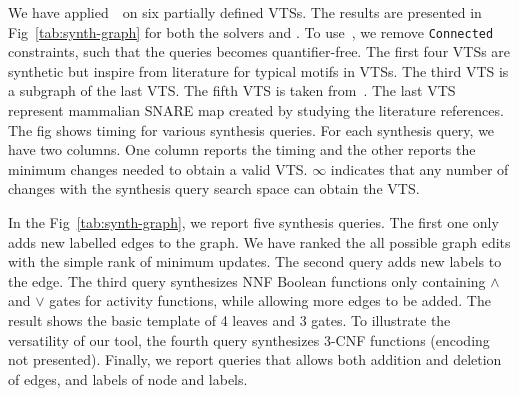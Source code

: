 
We have applied~\ourtool~on six partially defined VTSs.
%
The results are presented in Fig~\ref{tab:synth-graph} for both the solvers
\depqbf and \zthree.
%
To use~\zthree, we remove \texttt{Connected} constraints, such that the queries becomes
quantifier-free.
%
%
%
The first four VTSs are synthetic but inspire from literature for
typical motifs in VTSs. 
The third VTS is a subgraph of the last VTS.
%
%
The fifth VTS is taken from~\cite{burri2004complete}.
%
The last VTS represent mammalian SNARE map created by studying the literature references.  
%
The fig shows timing for various synthesis queries.
%
For each synthesis query, we have two columns.
%
One column reports the timing and the other reports the minimum changes needed to obtain a valid VTS.
%
$\infty$ indicates that any number of changes with the synthesis query
search space can obtain the VTS.
%

In the Fig~\ref{tab:synth-graph}, we report five synthesis queries.
%
The first one only adds new labelled edges to the graph.
%
We have ranked the all possible graph edits with the simple rank of
minimum updates.
%
The second query adds new labels to the edge.
%
The third query synthesizes NNF Boolean functions only containing
$\land$ and $\lor$ gates for activity functions, while allowing
more edges to be added.
%
The result shows the basic template of 4 leaves and 3 gates.
%
%
To illustrate the versatility of our tool, the fourth query
synthesizes $3$-CNF functions (encoding not presented).
%
Finally, we report queries that allows both addition and deletion of edges, and labels
of node and labels. 

%
%

